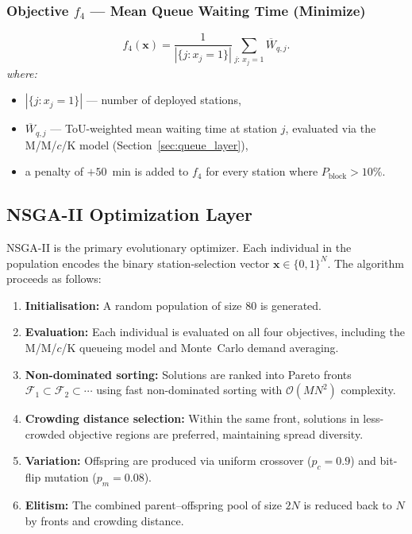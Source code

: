 \subsubsection*{Objective $f_4$ — Mean Queue Waiting Time (Minimize)}
\begin{equation}
f_4(\mathbf{x})
= \frac{1}{|\{j : x_j = 1\}|}
  \sum_{j:\,x_j=1} \overline{W}_{q,j}.
\label{eq:f4}
\end{equation}
\textit{where:}
\begin{itemize}
  \item $|\{j : x_j = 1\}|$ — number of deployed stations,
  \item $\overline{W}_{q,j}$ — ToU-weighted mean waiting time at station
        $j$, evaluated via the M/M/$c$/K model
        (Section~\ref{sec:queue_layer}),
  \item a penalty of $+50$~min is added to $f_4$ for every station
        where $P_{\mathrm{block}} > 10\%$.
\end{itemize}

\subsection{NSGA-II Optimization Layer}
\label{sec:nsgaii_layer}

NSGA-II is the primary evolutionary optimizer. Each individual in the
population encodes the binary station-selection vector
$\mathbf{x} \in \{0,1\}^N$. The algorithm proceeds as follows:

\begin{enumerate}
    \item \textbf{Initialisation:} A random population of size 80 is
          generated.
    \item \textbf{Evaluation:} Each individual is evaluated on all four
          objectives, including the M/M/$c$/K queueing model and
          Monte~Carlo demand averaging.
    \item \textbf{Non-dominated sorting:} Solutions are ranked into
          Pareto fronts $\mathcal{F}_1 \subset \mathcal{F}_2 \subset \cdots$
          using fast non-dominated sorting with
          $\mathcal{O}(MN^2)$ complexity.
    \item \textbf{Crowding distance selection:} Within the same front,
          solutions in less-crowded objective regions are preferred,
          maintaining spread diversity.
    \item \textbf{Variation:} Offspring are produced via uniform crossover
          ($p_c = 0.9$) and bit-flip mutation ($p_m = 0.08$).
    \item \textbf{Elitism:} The combined parent--offspring pool of size
          $2N$ is reduced back to $N$ by fronts and crowding distance.
\end{enumerate}

